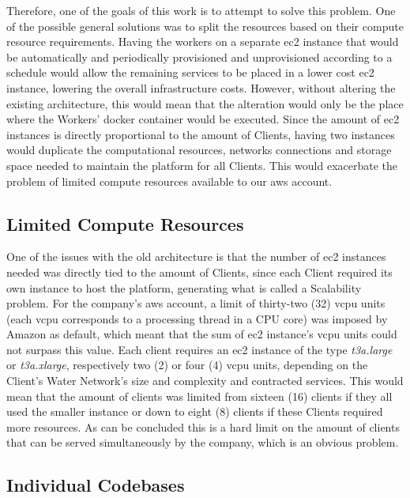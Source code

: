 Therefore, one of the goals of this work is to attempt to solve this problem. One of the possible general solutions was to split the resources based on their compute resource requirements. Having the workers on a separate \gls{ec2} instance that would be automatically and periodically provisioned and unprovisioned according to a schedule would allow the remaining services to be placed in a lower cost \gls{ec2} instance, lowering the overall infrastructure costs. However, without altering the existing architecture, this would mean that the alteration would only be the place where the Workers' docker container would be executed. Since the amount of \gls{ec2} instances is directly proportional to the amount of Clients, having two instances would duplicate the computational resources, networks connections and storage space needed to maintain the platform for all Clients. This would exacerbate the problem of limited compute resources available to our \gls{aws} account.

\subsection{Limited Compute Resources}\label{methodology:ss:limited-compute-resources}

One of the issues with the old architecture is that the number of \gls{ec2} instances needed was directly tied to the amount of Clients, since each Client required its own instance to host the platform, generating what is called a Scalability problem. For the company's \gls{aws} account, a limit of thirty-two (32) \gls{vcpu} units (each \gls{vcpu} corresponds to a processing thread in a CPU core) was imposed by Amazon as default, which meant that the sum of \gls{ec2} instance's \gls{vcpu} units could not surpass this value. Each client requires an \gls{ec2} instance of the type \textit{t3a.large} or \textit{t3a.xlarge}, respectively two (2) or four (4) \gls{vcpu} units, depending on the Client's Water Network's size and complexity and contracted services. This would mean that the amount of clients was limited from sixteen (16) clients if they all used the smaller instance or down to eight (8) clients if these Clients required more resources. As can be concluded this is a hard limit on the amount of clients that can be served simultaneously by the company, which is an obvious problem.

\subsection{Individual Codebases}\label{methodology:ss:individual-codebases}

